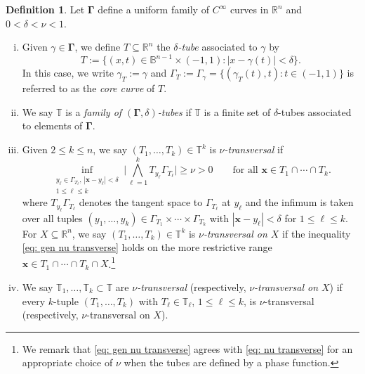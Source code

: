 \documentclass[reqno]{amsart}
\numberwithin{equation}{section}
\newcommand{\B}{\mathbb{B}}
\newcommand{\R}{\mathbb{R}}
\newcommand{\T}{\mathbb{T}}
\newcommand{\bx}{\mathbf{x}}
\newcommand{\bdGamma}{\boldsymbol{\Gamma}}
\theoremstyle{plain}
\theoremstyle{definition}
\newtheorem{definition}[theorem]{Definition}
\begin{document}
\begin{definition} Let $\bdGamma$ define a uniform family of $C^{\infty}$ curves in $\R^n$ and $0 < \delta < \nu < 1$. 
\begin{enumerate}[i)]
    \item Given $\gamma \in \bdGamma$, we define $T \subseteq \R^n$ the \textit{$\delta$-tube} associated to $\gamma$ by
\begin{equation*}%
    T := \big\{(x,t) \in \B^{n-1} \times (-1,1) : |x - \gamma(t)| < \delta \big\}.
\end{equation*}
In this case, we write $\gamma_T := \gamma$ and $\Gamma_T := \Gamma_{\gamma} = \{(\gamma_T(t), t) : t \in (-1,1)\}$ is referred to as the \textit{core curve} of $T$. 
\item We say $\T$ is a \textit{family of $(\bdGamma, \delta)$-tubes} if $\T$ is a finite set of $\delta$-tubes associated to elements of $\bdGamma$. 
\item Given $2 \leq k \leq n$, we say $(T_1, \dots, T_k) \in \T^k$ is \textit{$\nu$-transversal} if
\begin{equation}\label{eq: gen nu transverse}
   \inf_{\substack{y_{\ell} \in \Gamma_{{T_\ell}},\, |\bx - y_{\ell}| < \delta \\ 1 \leq \ell \leq k}} \big| \bigwedge_{\ell = 1}^k T_{y_{\ell}} \Gamma_{T_{\ell}} \big| \geq \nu > 0 \qquad \textrm{for all $\bx \in T_1 \cap \cdots \cap T_k$.}
\end{equation}
where $T_{y_{\ell}} \Gamma_{T_{\ell}}$ denotes the tangent space to $\Gamma_{T_{\ell}}$ at $y_{\ell}$ and the infimum is taken over all tuples $(y_1, \dots, y_k) \in \Gamma_{T_1} \times \cdots \times \Gamma_{T_k}$ with $|\bx - y_{\ell}| < \delta$ for $1 \leq \ell \leq k$. For $X \subseteq \R^n$, we say $(T_1, \dots, T_k) \in \T^k$ is \textit{$\nu$-transversal on $X$} if the inequality \eqref{eq: gen nu transverse} holds on the more restrictive range $\bx \in T_1 \cap \cdots \cap T_k \cap X$.\footnote{We remark that \eqref{eq: gen nu transverse} agrees with \eqref{eq: nu transverse} for an appropriate choice of $\nu$ when the tubes are defined by a phase function.}
\item We say $\T_1,\dots, \T_k \subset \T$ are \textit{$\nu$-transversal} (respectively, \textit{$\nu$-transversal on $X$}) if every $k$-tuple $(T_1, \dots, T_k)$ with $T_{\ell} \in \T_{\ell}$, $1 \leq \ell \leq k$, is $\nu$-transversal  (respectively, $\nu$-transversal on $X$).
\end{enumerate}
\end{definition}
\end{document}
